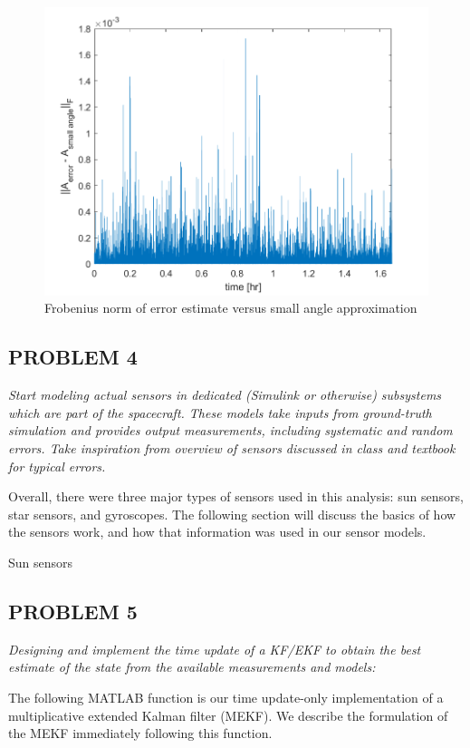 \begin{figure}[H]
\centering
\includegraphics[scale=0.6]{Images/ps7_problem3.png}
\caption{Frobenius norm of error estimate versus small angle approximation}
\label{fig:ps7_problem3}
\end{figure}

\subsection{PROBLEM 4}
\textit{Start modeling actual sensors in dedicated (Simulink or otherwise) subsystems which are part of the spacecraft. These models take inputs from ground-truth simulation and provides output measurements, including systematic and random errors. Take inspiration from overview of sensors discussed in class and textbook for typical errors.}

Overall, there were three major types of sensors used in this analysis: sun sensors, star sensors, and gyroscopes. The following section will discuss the basics of how the sensors work, and how that information was used in our sensor models.

Sun sensors 

\subsection{PROBLEM 5}
\textit{Designing and implement the time update of a KF/EKF to obtain the best estimate of the state from the available measurements and models:}

The following MATLAB function is our time update-only implementation of a multiplicative extended Kalman filter (MEKF). We describe the formulation of the MEKF immediately following this function.

